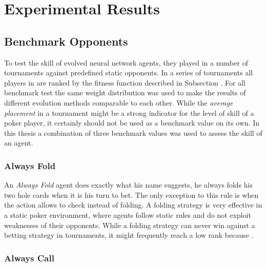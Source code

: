 

\chapter{Experimental Results}
\label{cha:results}


\section{Benchmark Opponents}
To test the skill of evolved neural network agents, they played in a number of tournaments against predefined static opponents. In a series of tournaments all players in are ranked by the fitness function described in Subsection . For all benchmark test the same weight distribution was used to make the results of different evolution methods comparable to each other. While the \textit{average placement} in a tournament might be a strong indicator for the level of skill of a poker player, it certainly should not be used as a benchmark value on its own. In this thesis a combination of three benchmark values was used to assess the skill of an agent. 

\subsection{Always Fold}
An \textit{Always Fold} agent does exactly what his name suggests, he always folds his two hole cards when it is his turn to bet. The only exception to this rule is when the action allows to check instead of folding. A folding strategy is very effective in a static poker environment, where agents follow static rules and do not exploit weaknesses of their opponents. While a folding strategy can never win against a betting strategy in tournaments, it might frequently reach a low rank because .
\subsection{Always Call}
